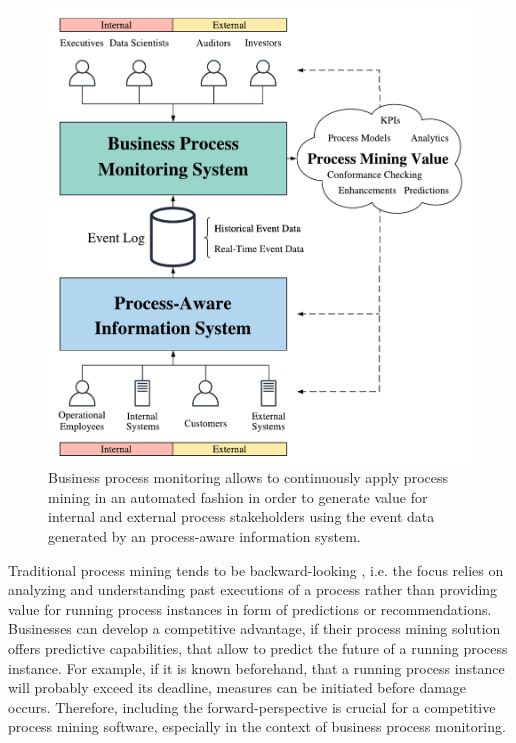 \begin{figure}[htbp!]
	\centering
	\includegraphics[width=\textwidth]{figures/process-monitoring}
	\caption{Business process monitoring allows to continuously apply process mining in an automated fashion in order to generate value for internal and external process stakeholders using the event data generated by an process-aware information system.}
	\label{fig:process-monitoring}
\end{figure}

Traditional process mining tends to be backward-looking \cite{DBLP:conf/scsc/Aalst18}, i.e. the focus relies on analyzing and understanding past executions of a process rather than providing value for running process instances in form of predictions or recommendations.
Businesses can develop a competitive advantage, if their process mining solution offers predictive capabilities, that allow to predict the future of a running process instance.
For example, if it is known beforehand, that a running process instance will probably exceed its deadline, measures can be initiated before damage occurs.
Therefore, including the forward-perspective is crucial for a competitive process mining software, especially in the context of business process monitoring.

